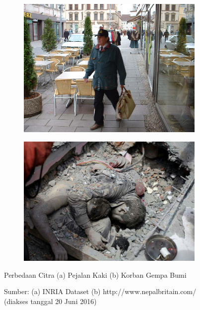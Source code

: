 \begin{figure}[ht]
  \centering
  \begin{subfigure}[b]{0.49\textwidth}
    \includegraphics[width=\textwidth]{pedestrian}
    \caption{}
  \end{subfigure}             
  \begin{subfigure}[b]{0.49\textwidth}
    \includegraphics[width=\textwidth]{victim}
    \caption{}
  \end{subfigure}
  \caption{Perbedaan Citra (a) Pejalan Kaki (b) Korban Gempa Bumi}
  \caption*{Sumber: (a) INRIA Dataset (b) http://www.nepalbritain.com/ (diakses tanggal 20 Juni 2016)}
  \label{fig:comp_pedestrian_victim}
\end{figure}

